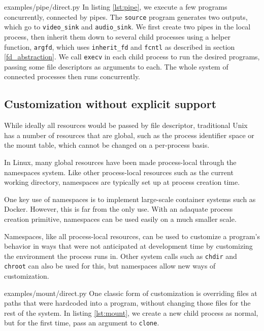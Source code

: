 \documentclass[letterpaper,twocolumn,10pt]{article}
\begin{document}

{examples/pipe/direct.py}
In listing \ref{lst:pipe},
we execute a few programs concurrently,
connected by pipes.
The \texttt{source} program generates two outputs, which go to \texttt{video\_sink} and \texttt{audio\_sink}.
We first create two pipes in the local process,
then inherit them down to several child processes using a helper function, \verb|argfd|,
which uses \verb|inherit_fd| and \texttt{fcntl} as described in section \ref{fd_abstraction}.
We call \texttt{execv} in each child process to run the desired programs,
passing some file descriptors as arguments to each.
The whole system of connected processes then runs concurrently.
\subsection{Customization without explicit support}
While ideally all resources would be passed by file descriptor,
traditional Unix has a number of resources that are global,
such as the process identifier space or the mount table,
which cannot be changed on a per-process basis\cite{capsicum}.

In Linux, many global resources have been made process-local
through the namespaces system\cite{lwn_namespaces}.
Like other process-local resources such as the current working directory,
namespaces are typically set up at process creation time.

One key use of namespaces is to implement large-scale container systems such as Docker\cite{lwn_namespaces}.
However, this is far from the only use.
With an adaquate process creation primitive,
namespaces can be used easily on a much smaller scale.

Namespaces, like all process-local resources,
can be used to customize a program's behavior
in ways that were not anticipated at development time
by customizing the environment the process runs in\cite{plan9ns}.
Other system calls such as \texttt{chdir} and \texttt{chroot} can also be used for this,
but namespaces allow new ways of customization\cite{mount_namespaces}.


{examples/mount/direct.py}
One classic form of customization
is overriding files at paths that were hardcoded into a program,
without changing those files for the rest of the system.
In listing \ref{lst:mount},
we create a new child process as normal,
but for the first time,
pass an argument to \texttt{clone}.
\end{document}
